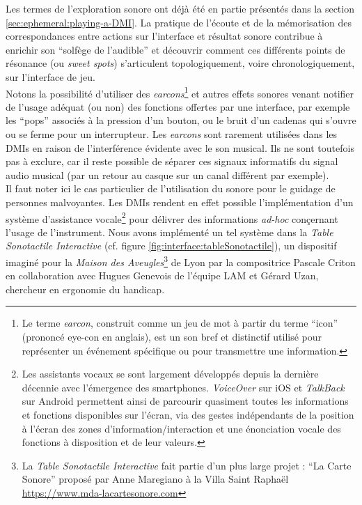 \noindent Les termes de l'exploration sonore ont déjà été en partie présentés dans la section \ref{sec:ephemeral:playing-a-DMI}. La pratique de l'écoute et de la mémorisation des correspondances entre actions sur l'interface et résultat sonore contribue à enrichir son ``solfège de l'audible'' \cite{savouret_introduction_2010} et découvrir comment ces différents points de résonance (ou \textit{sweet spots}) s'articulent topologiquement, voire chronologiquement, sur l'interface de jeu.\\
\indent Notons la possibilité d'utiliser des \textit{earcons}\footnote{Le terme \textit{earcon}, construit comme un jeu de mot à partir du terme ``icon'' (prononcé eye-con en anglais), est un son bref et distinctif utilisé pour représenter un événement spécifique ou pour transmettre une information.} et autres effets sonores venant notifier de l'usage adéquat (ou non) des fonctions offertes par une interface, par exemple les ``pops'' associés à la pression d'un bouton, ou le bruit d'un cadenas qui s'ouvre ou se ferme pour un interrupteur. Les \textit{earcons} sont rarement utilisées dans les \glspl{DMI} en raison de l'interférence évidente avec le son musical. Ils ne sont toutefois pas à exclure, car il reste possible de séparer ces signaux informatifs du signal audio musical (par un retour au casque sur un canal différent par exemple).\\
\indent Il faut noter ici le cas particulier de l'utilisation du sonore pour le guidage de personnes malvoyantes. Les \glspl{DMI} rendent en effet possible l'implémentation d'un système d'assistance vocale\footnote{Les assistants vocaux se sont largement développés depuis la dernière décennie avec l'émergence des smartphones. \textit{VoiceOver} sur iOS et \textit{TalkBack} sur Android permettent ainsi de parcourir quasiment toutes les informations et fonctions disponibles sur l'écran, via des gestes indépendants de la position à l'écran des zones d'information/interaction et une énonciation vocale des fonctions à disposition et de leur valeurs.}
 pour délivrer des informations \textit{ad-hoc} conçernant l'usage de l'instrument. Nous avons implémenté un tel système dans la \textit{Table Sonotactile Interactive} (cf. figure \ref{fig:interface:tableSonotactile}), un dispositif imaginé pour la \textit{Maison des Aveugles}\footnote{La \textit{Table Sonotactile Interactive} fait partie d'un plus large projet : ``La Carte Sonore'' proposé par Anne Maregiano à la Villa Saint Raphaël \url{https://www.mda-lacartesonore.com}} de Lyon par la compositrice Pascale Criton en collaboration avec Hugues Genevois de l'équipe \gls{LAM} et Gérard Uzan, chercheur en ergonomie du handicap.
